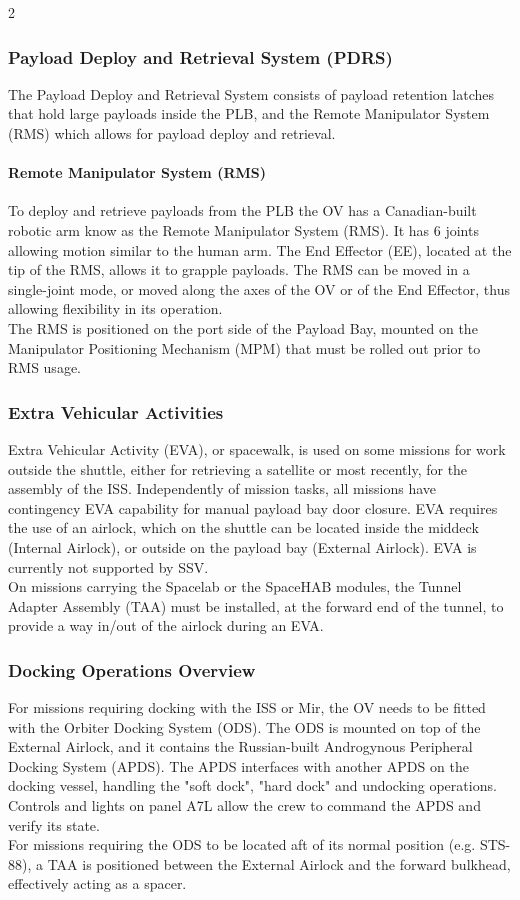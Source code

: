 \documentclass[Space_Shuttle_Vessel_Manual.tex]{subfiles}
\begin{document}
\begin{multicols*}{2}
\subsubsection{Payload Deploy and Retrieval System (PDRS)}
The Payload Deploy and Retrieval System consists of payload retention latches that hold large payloads inside the PLB, and the Remote Manipulator System (RMS) which allows for payload deploy and retrieval.

\paragraph{Remote Manipulator System (RMS)}
To deploy and retrieve payloads from the PLB the OV has a Canadian-built robotic arm know as the Remote Manipulator System (RMS). It has 6 joints allowing motion similar to the human arm. The End Effector (EE), located at the tip of the RMS, allows it to grapple payloads. The RMS can be moved in a single-joint mode, or moved along the axes of the OV or of the End Effector, thus allowing flexibility in its operation.\\
The RMS is positioned on the port side of the Payload Bay, mounted on the Manipulator Positioning Mechanism (MPM) that must be rolled out prior to RMS usage.


\subsubsection{Extra Vehicular Activities}
Extra Vehicular Activity (EVA), or spacewalk, is used on some missions for work outside the shuttle, either for retrieving a satellite or most recently, for the assembly of the ISS. Independently of mission tasks, all missions have contingency EVA capability for manual payload bay door closure. EVA requires the use of an airlock, which on the shuttle can be located inside the middeck (Internal Airlock), or outside on the payload bay (External Airlock). EVA is currently not supported by SSV.\\
On missions carrying the Spacelab or the SpaceHAB modules, the Tunnel Adapter Assembly (TAA) must be installed, at the forward end of the tunnel, to provide a way in/out of the airlock during an EVA.


\subsubsection{Docking Operations Overview}
For missions requiring docking with the ISS or Mir, the OV needs to be fitted with the Orbiter Docking System (ODS). The ODS is mounted on top of the External Airlock, and it contains the Russian-built Androgynous Peripheral Docking System (APDS). The APDS interfaces with another APDS on the docking vessel, handling the "soft dock", "hard dock" and undocking operations. Controls and lights on panel A7L allow the crew to command the APDS and verify its state.\\
For missions requiring the ODS to be located aft of its normal position (e.g. STS-88), a TAA is positioned between the External Airlock and the forward bulkhead, effectively acting as a spacer.



\end{multicols*}
\end{document}
